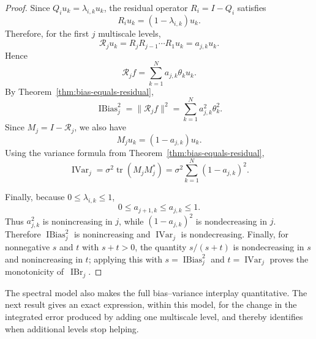 \documentclass[12pt]{article}
\DeclareMathOperator{\ibr}{IBr}
\newcommand{\ibias}{\operatorname{IBias}^2}
\DeclareMathOperator{\ivar}{IVar}
\begin{document}
\begin{proof}
Since \(Q_i u_k=\lambda_{i,k}u_k\), the residual operator \(R_i=I-Q_i\) satisfies
\[
    R_i u_k=(1-\lambda_{i,k})u_k .
\]
Therefore, for the first \(j\) multiscale levels,
\[
    \mathcal R_j u_k
    =
    R_jR_{j-1}\cdots R_1u_k
    =
    a_{j,k}u_k .
\]
Hence
\[
    \mathcal R_j f
    =
    \sum_{k=1}^N a_{j,k}\theta_k u_k .
\]
By Theorem~\ref{thm:bias-equals-residual},
\[
    \ibias_j=\|\mathcal R_j f\|^2
    =
    \sum_{k=1}^N a_{j,k}^2\theta_k^2 .
\]
Since \(M_j=I-\mathcal R_j\), we also have
\[
    M_j u_k=(1-a_{j,k})u_k .
\]
Using the variance formula from Theorem~\ref{thm:bias-equals-residual},
\[
    \ivar_j
    =
    \sigma^2\operatorname{tr}(M_jM_j^*)
    =
    \sigma^2
    \sum_{k=1}^N (1-a_{j,k})^2 .
\]

Finally, because \(0\leq \lambda_{i,k}\leq 1\),
\[
    0\leq a_{j+1,k}\leq a_{j,k}\leq 1 .
\]
Thus \(a_{j,k}^2\) is nonincreasing in \(j\), while \((1-a_{j,k})^2\) is nondecreasing in \(j\). Therefore \(\ibias_j\) is nonincreasing and \(\ivar_j\) is nondecreasing. Finally, for nonnegative \(s\) and \(t\) with \(s+t>0\), the quantity \(s/(s+t)\) is nondecreasing in \(s\) and nonincreasing in \(t\); applying this with \(s=\ibias_j\) and \(t=\ivar_j\) proves the monotonicity of~\(\ibr_j\).
\end{proof}

The spectral model also makes the full bias--variance interplay quantitative. The next result gives an exact expression, within this model, for the change in the integrated error produced by adding one multiscale level, and thereby identifies when additional levels stop helping.
\end{document}
